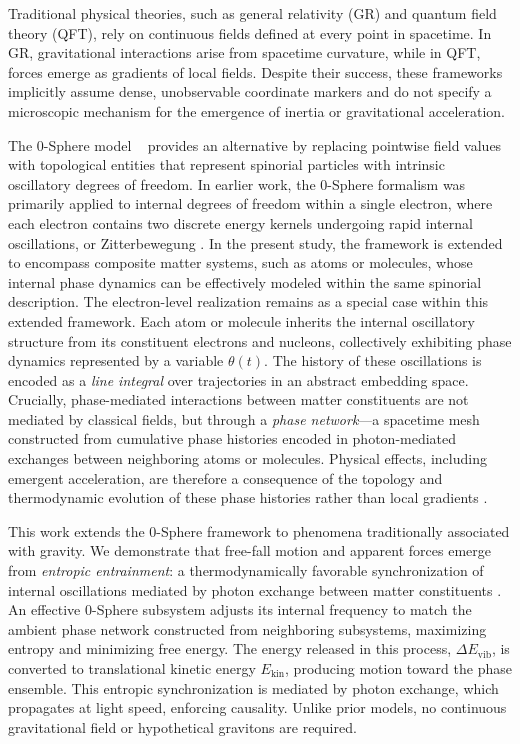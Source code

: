 \documentclass[%
 reprint,
 amsmath,amssymb,
 aps,
 prb,
]{revtex4-2}
\numberwithin{equation}{section}
\begin{document}
Traditional physical theories, such as general relativity (GR) \cite{Einstein1916} and quantum field theory (QFT), rely on continuous fields defined at every point in spacetime. In GR, gravitational interactions arise from spacetime curvature, while in QFT, forces emerge as gradients of local fields. Despite their success, these frameworks implicitly assume dense, unobservable coordinate markers and do not specify a microscopic mechanism for the emergence of inertia or gravitational acceleration.

The 0-Sphere model ~\cite{Hanamura2025Trilogy1,Hanamura2026Trilogy2,Hanamura2026Trilogy3} provides an alternative by replacing pointwise field values with topological entities that represent spinorial particles with intrinsic oscillatory degrees of freedom. In earlier work, the 0-Sphere formalism was primarily applied to internal degrees of freedom within a single electron, where each electron contains two discrete energy kernels undergoing rapid internal oscillations, or Zitterbewegung \cite{Schrodinger1930,Dirac1928,Barut1981}. In the present study, the framework is extended to encompass composite matter systems, such as atoms or molecules, whose internal phase dynamics can be effectively modeled within the same spinorial description. The electron-level realization remains as a special case within this extended framework. Each atom or molecule inherits the internal oscillatory structure from its constituent electrons and nucleons, collectively exhibiting phase dynamics represented by a variable $\theta(t)$. The history of these oscillations is encoded as a \textit{line integral} over trajectories in an abstract embedding space. Crucially, phase-mediated interactions between matter constituents are not mediated by classical fields, but through a \textit{phase network}—a spacetime mesh constructed from cumulative phase histories encoded in photon-mediated exchanges between neighboring atoms or molecules. Physical effects, including emergent acceleration, are therefore a consequence of the topology and thermodynamic evolution of these phase histories rather than local gradients \cite{Hanamura2026Trilogy3,AharonovBohm1959,Berry1984,WilsonLoop1974}.

This work extends the 0-Sphere framework to phenomena traditionally associated with gravity. We demonstrate that free-fall motion and apparent forces emerge from \textit{entropic entrainment}: a thermodynamically favorable synchronization of internal oscillations mediated by photon exchange between matter constituents \cite{Pikovsky2001,Strogatz2000,Bennett2002}. An effective 0-Sphere subsystem adjusts its internal frequency to match the ambient phase network constructed from neighboring subsystems, maximizing entropy and minimizing free energy. The energy released in this process, $\Delta E_\text{vib}$, is converted to translational kinetic energy $E_\text{kin}$, producing motion toward the phase ensemble. This entropic synchronization is mediated by photon exchange, which propagates at light speed, enforcing causality. Unlike prior models, no continuous gravitational field or hypothetical gravitons are required.
\end{document}
